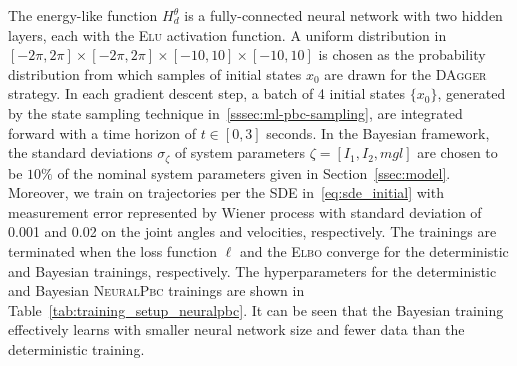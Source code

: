The energy-like function $H_d^\theta$ is a fully-connected neural network with
two hidden layers, each with the \textsc{Elu} activation function. 
%
%
%
A uniform distribution in $[-2\pi, 2\pi] \times [-2\pi, 2\pi] \times [-10, 10]
\times [-10, 10]$ is chosen as the probability distribution from which samples
of initial states $x_0$ are drawn for the \textsc{DAgger} strategy.
%
In each gradient descent step, a batch of 4 initial states $\{x_0\}$,
generated by the state sampling technique in~\ref{sssec:ml-pbc-sampling}, are
integrated forward with a time horizon of $t \in [0,3]$ seconds. 
%
In the Bayesian framework, the standard deviations $\sigma_{\zeta}$ of system
parameters $\zeta = [I_1, I_2, mgl]$ are chosen to be $10\%$ of the nominal system
parameters given in Section~\ref{ssec:model}.
%
Moreover, we train on trajectories per the SDE in~\eqref{eq:sde_initial} with
measurement error represented by Wiener process with standard deviation of 0.001
and 0.02 on the joint angles and velocities, respectively.
%
%
%
The trainings are terminated when the loss function $\ell$ and the \textsc{Elbo}
converge for the deterministic and Bayesian trainings, respectively.
%
The hyperparameters for the deterministic and Bayesian \textsc{NeuralPbc}
trainings are shown in Table~\ref{tab:training_setup_neuralpbc}.
%
It can be seen that the Bayesian training effectively learns with smaller neural
network size and fewer data than the deterministic training.
